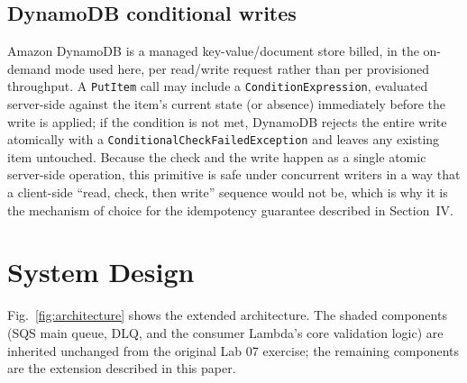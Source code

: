 \documentclass[conference]{IEEEtran}
\newcommand{\brk}{\discretionary{}{}{}}
\begin{document}
\subsection{DynamoDB conditional writes}
Amazon DynamoDB is a managed key-value/document store billed, in the on-demand mode used here, per read/write request rather than per provisioned throughput. A \texttt{PutItem} call may include a \texttt{ConditionExpression}, evaluated server-side against the item's current state (or absence) immediately before the write is applied; if the condition is not met, DynamoDB rejects the entire write atomically with a \texttt{Conditional\brk Check\brk Failed\brk Exception} and leaves any existing item untouched. Because the check and the write happen as a single atomic server-side operation, this primitive is safe under concurrent writers in a way that a client-side ``read, check, then write'' sequence would not be, which is why it is the mechanism of choice for the idempotency guarantee described in Section~IV.

\section{System Design}

Fig.~\ref{fig:architecture} shows the extended architecture. The shaded components (SQS main queue, DLQ, and the consumer Lambda's core validation logic) are inherited unchanged from the original Lab 07 exercise; the remaining components are the extension described in this paper.
\end{document}
